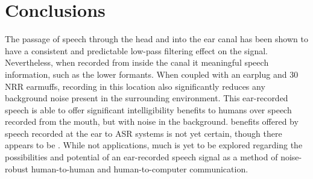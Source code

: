 \section{Conclusions}\label{chap5:conclusions}

The passage of speech through the head and into the ear canal has been shown to have a consistent and predictable low-pass filtering effect on the signal.  Nevertheless, when recorded from inside the canal it \DIFdelbegin {}\DIFdelend \DIFaddbegin {}\DIFaddend meaningful speech information, such as the lower formants.  When coupled with an earplug and 30 NRR earmuffs, recording in this location also significantly reduces any background noise present in the surrounding environment.  This ear-recorded speech is able to offer significant intelligibility benefits to humans over speech recorded from the mouth, but with noise in the background.  \DIFdelbegin {}\DIFdelend \DIFaddbegin {}\DIFaddend benefits offered by speech recorded at the ear to ASR systems is not yet certain, though there appears to be \DIFdelbegin {}\DIFdelend \DIFaddbegin {}\DIFaddend . While not \DIFdelbegin {}\DIFdelend \DIFaddbegin {}\DIFaddend applications, much is yet to be explored regarding the possibilities and potential of an ear-recorded speech signal as a method of noise-robust human-to-human and human-to-computer communication.





